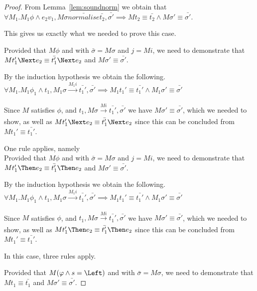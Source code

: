 \begin{proof}
{{      From Lemma~\ref{lem:soundnorm} we obtain that $\forall M_1. M_1 \phi \land e_2 v_1,M\sigma\bar{normalise}\bar{t_2},\bar{\sigma'}\implies M t_2\equiv\bar{t_2}\land M \sigma'\equiv\bar{\sigma'}$.

      This gives us exactly what we needed to prove this case.

      }
    {Provided that $M\phi$ and  with $\bar{\sigma}=M\sigma$ and $j= M i$,
    we need to demonstrate that $M t_1' \Next e_2 \equiv \bar{t_1'}\Next e_2$ and $M\sigma'\equiv\bar{\sigma'}$.

    By the induction hypothesis we obtain the following.\\
    $\forall M_1 . M_1 \phi_1 \land t_1,M_1\sigma \xrightarrow[]{M_1 i} \bar{t_1'},\bar{\sigma'}\implies M_1 t_1'\equiv\bar{t_1'}\land M_1\sigma' \equiv \bar{\sigma'}$

    Since $M$ satisfies $\phi$, and $t_1,M\sigma \xrightarrow[]{M i} \bar{t_1'},\bar{\sigma'}$ we have $M\sigma'\equiv\bar{\sigma'}$,
    which we needed to show, as well as $M t_1' \Next e_2 \equiv \bar{t_1'}\Next e_2$ since this can be concluded from $M t_1'\equiv \bar{t_1'}$.
    }
  }

  {One rule applies, namely \\
  Provided that $M\phi$ and  with $\bar{\sigma}=M\sigma$ and $j= M i$,
  we need to demonstrate that $M t_1'\Then e_2\equiv \bar{t_1'}\Then e_2$ and $M\sigma'\equiv\bar{\sigma'}$.

  By the induction hypothesis we obtain the following.\\
  $\forall M_1 . M_1 \phi_1 \land t_1,M_1\sigma \xrightarrow[]{M_1 i} \bar{t_1'},\bar{\sigma'}\implies M_1 t_1'\equiv\bar{t_1'}\land M_1\sigma' \equiv \bar{\sigma'}$

  Since $M$ satisfies $\phi$, and $t_1,M\sigma \xrightarrow[]{M i} \bar{t_1'},\bar{\sigma'}$ we have $M\sigma'\equiv\bar{\sigma'}$,
  which we needed to show, as well as $M t_1' \Then e_2 \equiv \bar{t_1'}\Then e_2$ since this can be concluded from $M t_1'\equiv \bar{t_1'}$.

  }

  {
  In this case, three rules apply.\\
    {
    }
    {Provided that $M(\phi\wedge s=\Left)$ and  with $\bar{\sigma}=M\sigma$,
    we need to demonstrate that $M t_1\equiv \bar{t_1}$ and $M\sigma'\equiv \bar{\sigma'}$.

}}
\end{proof}
